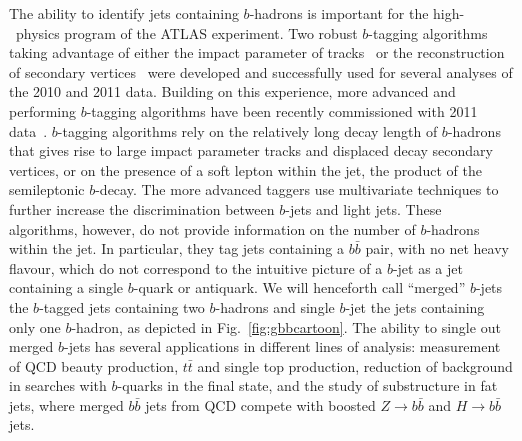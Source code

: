 The ability to identify jets containing $b$-hadrons is important for the high-\pt\ physics program of the ATLAS experiment. Two robust $b$-tagging algorithms taking
advantage of either the impact parameter of tracks~\cite{ATLAS-CONF-2010-091} or the reconstruction of secondary vertices~\cite{ATLAS-CONF-2010-042} were developed and successfully used for several analyses of the 2010 and 2011 data. Building on this experience, more advanced and performing $b$-tagging algorithms have been recently commissioned with 2011 data~\cite{ATLAS-CONF-2011-102}.
$b$-tagging algorithms rely on the relatively long decay length of $b$-hadrons that gives rise to large impact parameter tracks and displaced decay secondary vertices, or on the presence of a soft lepton within the jet, the product of the semileptonic $b$-decay. The more advanced taggers %
use multivariate techniques %
to further increase the discrimination between $b$-jets and light jets.
These algorithms, however, do not provide information on the number of $b$-hadrons within the jet. In particular, they tag jets containing a $b\bar{b}$ pair, with no net heavy flavour, which do not correspond to the intuitive picture of a
$b$-jet as a jet containing a single $b$-quark or antiquark.
We will henceforth call ``merged'' $b$-jets %
the $b$-tagged jets containing two $b$-hadrons and single $b$-jet the jets containing only one $b$-hadron, as depicted in Fig.~\ref{fig:gbbcartoon}. The ability to single out merged $b$-jets
has several applications in different lines of analysis: measurement of QCD beauty production, $t\bar{t}$ and single top production, reduction of background in searches with $b$-quarks in the final state, and the study of substructure in fat jets, where merged $b\bar{b}$ jets from QCD compete with boosted $Z\rightarrow b\bar{b}$ and $H\rightarrow b\bar{b}$ jets.
